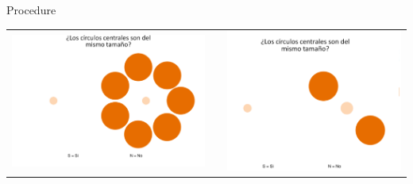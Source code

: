 \documentclass[final]{beamer}
\newlength{\onecolwid}
\newlength{\twocolwid}
\begin{document}
\begin{frame}[t]
\begin{columns}[t]
\begin{column}{\twocolwid}
\begin{columns}[t,totalwidth=\twocolwid]
\begin{column}{\onecolwid}

\begin{block}{Procedure}

\begin{center}
\begin{tabular}{ccc}
\includegraphics[width=0.55\linewidth]{Figures/MainTask.png} & \hfill & \includegraphics[width=0.5\linewidth]{Figures/MainTask2.png}
\end{tabular}
\end{center}



\end{block}



\end{column}
\end{columns}
\end{column}
\end{columns}
\end{frame}
\end{document}
